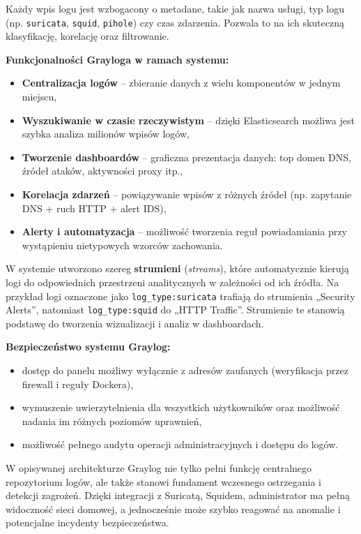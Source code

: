 \documentclass[
    left=2.5cm,         %
    right=2.5cm,        %
    top=2.5cm,          %
    bottom=3cm,         %
    bindingoffset=6mm,  %
    nohyphenation=true %
]{eiti/eiti-thesis} %
\begin{document}
Każdy wpis logu jest wzbogacony o metadane, takie jak nazwa usługi, typ logu (np. \texttt{suricata}, \texttt{squid}, \texttt{pihole}) czy czas zdarzenia. Pozwala to na ich skuteczną klasyfikację, korelację oraz filtrowanie.

\textbf{Funkcjonalności Grayloga w ramach systemu:}
\begin{itemize}
    \item \textbf{Centralizacja logów} – zbieranie danych z wielu komponentów w jednym miejscu,
    \item \textbf{Wyszukiwanie w czasie rzeczywistym} – dzięki Elasticsearch możliwa jest szybka analiza milionów wpisów logów,
    \item \textbf{Tworzenie dashboardów} – graficzna prezentacja danych: top domen DNS, źródeł ataków, aktywności proxy itp.,
    \item \textbf{Korelacja zdarzeń} – powiązywanie wpisów z różnych źródeł (np. zapytanie DNS + ruch HTTP + alert IDS),
    \item \textbf{Alerty i automatyzacja} – możliwość tworzenia reguł powiadamiania przy wystąpieniu nietypowych wzorców zachowania.
\end{itemize}

W systemie utworzono szereg \textbf{strumieni} (\textit{streams}), które automatycznie kierują logi do odpowiednich przestrzeni analitycznych w zależności od ich źródła. Na przykład logi oznaczone jako \texttt{log\_type:suricata} trafiają do strumienia „Security Alerts”, natomiast \texttt{log\_type:squid} do „HTTP Traffic”. Strumienie te stanowią podstawę do tworzenia wizualizacji i analiz w dashboardach.

\textbf{Bezpieczeństwo systemu Graylog:}
\begin{itemize}
    \item dostęp do panelu możliwy wyłącznie z adresów zaufanych (weryfikacja przez firewall i reguły Dockera),
    \item wymuszenie uwierzytelnienia dla wszystkich użytkowników oraz możliwość nadania im różnych poziomów uprawnień,
    \item możliwość pełnego audytu operacji administracyjnych i dostępu do logów.
\end{itemize}

W opisywanej architekturze Graylog nie tylko pełni funkcję centralnego repozytorium logów, ale także stanowi fundament wczesnego ostrzegania i detekcji zagrożeń. Dzięki integracji z Suricatą, Squidem, administrator ma pełną widoczność sieci domowej, a jednocześnie może szybko reagować na anomalie i potencjalne incydenty bezpieczeństwa.
\end{document}
